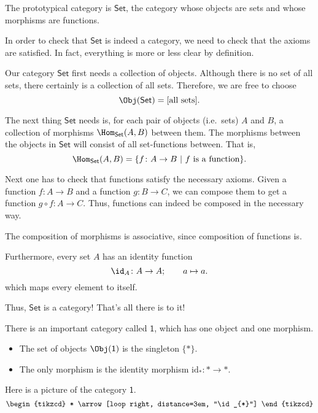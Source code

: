 \documentclass[notes.tex]{subfiles}
\begin{document}
\begin{example}
  The prototypical category is $\mathsf{Set}$, the category whose objects are sets and whose morphisms are functions.

  In order to check that $\mathsf{Set}$ is indeed a category, we need to check that the axioms are satisfied. In fact, everything is more or less clear by definition.

  Our category $\mathsf{Set}$ first needs a collection of objects. Although there is no set of all sets, there certainly is a collection of all sets. Therefore, we are free to choose
  \begin{equation*}
    \Obj(\mathsf{Set}) = [\text{all sets}].
  \end{equation*}

  The next thing $\mathsf{Set}$ needs is, for each pair of objects (i.e.\ sets) $A$ and $B$, a collection of morphisms $\Hom_{\mathsf{Set}}(A, B)$ between them. The morphisms between the objects in $\mathsf{Set}$ will consist of all set-functions between. That is,
  \begin{equation*}
    \Hom_{\mathsf{Set}}(A, B) = \{f\colon A \to B\ |\ f\ \text{is a function}\}.
  \end{equation*}

  Next one has to check that functions satisfy the necessary axioms. Given a function $f\colon A \to B$ and a function $g\colon B \to C$, we can compose them to get a function $g \circ f\colon A \to C$. Thus, functions can indeed be composed in the necessary way.

  The composition of morphisms is associative, since composition of functions is.

  Furthermore, every set $A$ has an identity function
  \begin{equation*}
    \id_{A}\colon A \to A;\qquad a \mapsto a.
  \end{equation*}
  which maps every element to itself.

  Thus, $\mathsf{Set}$ is a category! That's all there is to it!
\end{example}

\begin{example}
  \label{eg:categorywithoneobject}
  There is an important category called $\mathsf{1}$, which has one object and one morphism.
  \begin{itemize}
    \item The set of objects $\Obj(\mathsf{1})$ is the singleton $\{*\}$.

    \item The only morphism is the identity morphism $\mathrm{id}_{*}\colon * \to *$.
  \end{itemize}

  Here is a picture of the category $\mathsf{1}$.
  \begin{equation*}
    \begin{tikzcd}
      *
      \arrow[loop right, distance=3em, "\id_{*}"]
    \end{tikzcd}
  \end{equation*}
\end{example}
\end{document}
